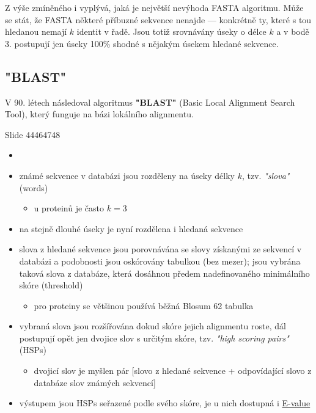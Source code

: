 \documentclass[DIV=8]{scrreprt}
\begin{document}
Z výše zmíněného i vyplývá, jaká je největší nevýhoda FASTA algoritmu. Může se stát, že FASTA některé příbuzné sekvence nenajde --- konkrétně ty, které s tou hledanou nemají \(k\) identit v řadě. Jsou totiž srovnávány úseky o délce \(k\) a v bodě 3. postupují jen úseky 100\% shodné s nějakým úsekem hledané sekvence.

\subsection{"BLAST"}

V 90. létech následoval algoritmus \textbf{"BLAST"} (Basic Local Alignment Search Tool), který funguje na bázi lokálního alignmentu.

Slide 44464748
\begin{itemize}
    \item 
    \item známé sekvence v databázi jsou rozděleny na úseky délky \(k\), tzv. \emph{"slova"} (words)
\begin{itemize}
    \item u proteinů je často \(k = 3\)
\end{itemize}

    \item na stejně dlouhé úseky je nyní rozdělena i hledaná sekvence
    \item slova z hledané sekvence jsou porovnávána se slovy získanými ze sekvencí v databázi a podobnosti jsou oskórovány tabulkou (bez mezer); jsou vybrána taková slova z databáze, která dosáhnou předem nadefinovaného minimálního skóre (threshold)
\begin{itemize}
    \item pro proteiny se většinou používá běžná Blosum 62 tabulka
\end{itemize}

    \item vybraná slova jsou rozšířována dokud skóre jejich alignmentu roste, dál postupují opět jen dvojice slov s určitým skóre, tzv. \emph{"high scoring pairs"} (HSPs)
\begin{itemize}
    \item dvojicí slov je myšlen pár [slovo z hledané sekvence + odpovídající slovo z databáze slov známých sekvencí]
\end{itemize}

    \item výstupem jsou HSPs seřazené podle svého skóre, je u nich dostupná i \href{#Parametry významnosti alignmentu}{E-value}
\end{itemize}
\end{document}
